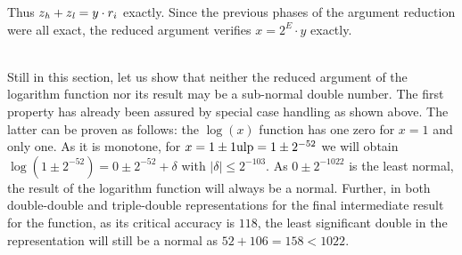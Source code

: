 Thus $z_{\mathit{h}} + z_{\mathit{l}} = y \cdot r_i$ exactly. Since the previous phases of the argument reduction were all exact, the reduced argument
verifies $x = 2^{E} \cdot y$ exactly.\\~\par
Still in this section, let us show that neither the reduced argument of the logarithm function nor its result may be
a sub-normal double number. The first property has already been assured by special case handling as shown above. The 
latter can be proven as follows: the $\log\left( x \right)$ function has one zero for $x = 1$ and only one. 
As it is monotone, for $x = 1 \pm 1 \mathrm{ulp} = 1 \pm 2^{-52}$ we will obtain $\log\left( 1 \pm 2^{-52} \right) = 0 \pm 2^{-52} + \delta$ 
with 
$\left \vert \delta \right \vert \leq 2^{-103}$. As $0 \pm 2^{-1022}$ is the least normal, the result of the logarithm function will
always be a normal. Further, in both double-double and triple-double representations for the final intermediate result
for the function, as its critical accuracy is $118$, the least significant double in the representation will still be
a normal as $52 + 106 = 158 < 1022$. 
